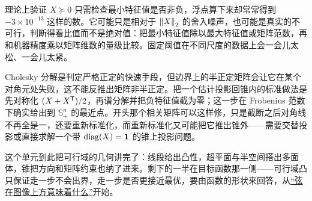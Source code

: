 理论上验证 \(X\succeq0\) 只需检查最小特征值是否非负，浮点算下来却常常得到 \(-3\times10^{-13}\) 这样的数。它可能只是相对于 \(\left\lVert X\right\rVert_2\) 的舍入噪声，也可能是真实的不可行，判断得看比值而不是绝对值：把最小特征值除以最大特征值或矩阵范数，再和机器精度乘以矩阵维数的量级比较。固定阈值在不同尺度的数据上会一会儿太松、一会儿太紧。

Cholesky 分解是判定严格正定的快速手段，但边界上的半正定矩阵会让它在某个对角元处失败，这不能反推出矩阵非半正定。把一个估计投影回锥内的标准做法是先对称化 \((X+X^{\mathsf{T}})/2\)，再谱分解并把负特征值截为零；这一步在 Frobenius 范数下确实给出到 \(\mathbb{S}_+^n\) 的最近点。开头那个相关矩阵可以这样修，只是截断之后对角线不再全是一，还要重新标准化，而重新标准化又可能把它推出锥外——需要交替投影或直接求解一个带 \(\operatorname{diag}(X)=\mathbf{1}\) 的锥上投影问题。

这个单元到此把可行域的几何讲完了：线段给出凸性，超平面与半空间搭出多面体，锥把方向和矩阵约束也纳了进来。剩下的一半在目标函数那一侧——可行域凸只保证走一步不会出界，走一步是否更接近最优，要由函数的形状来回答，从\hyperref[sec:09-Convex-Optimization/03-Convex-Functions/01]{``弦在图像上方意味着什么''}开始。
